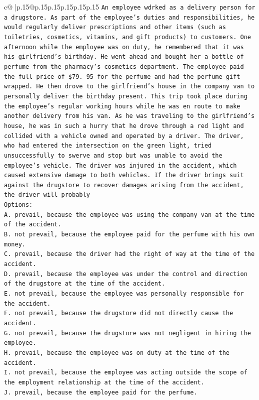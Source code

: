 \documentclass{article}
\begin{document}
{\begin{supertabular}{c@{$\;$}|p{.15\linewidth}@{}p{.15\linewidth}p{.15\linewidth}p{.15\linewidth}p{.15\linewidth}p{.15\linewidth}}
{{{\texttt{An employee wdrked as a delivery person for a drugstore. As part of the employee's duties and responsibilities, he would regularly deliver prescriptions and other items (such as toiletries, cosmetics, vitamins, and gift products) to customers. One afternoon while the employee was on duty, he remembered that it was his girlfriend's birthday. He went ahead and bought her a bottle of perfume from the pharmacy's cosmetics department. The employee paid the full price of \$79. 95 for the perfume and had the perfume gift wrapped. He then drove to the girlfriend's house in the company van to personally deliver the birthday present. This trip took place during the employee's regular working hours while he was en route to make another delivery from his van. As he was traveling to the girlfriend's house, he was in such a hurry that he drove through a red light and collided with a vehicle owned and operated by a driver. The driver, who had entered the intersection on the green light, tried unsuccessfully to swerve and stop but was unable to avoid the employee's vehicle. The driver was injured in the accident, which caused extensive damage to both vehicles. If the driver brings suit against the drugstore to recover damages arising from the accident, the driver will probably} \\
\texttt{Options:} \\
\texttt{A. prevail, because the employee was using the company van at the time of the accident.} \\
\texttt{B. not prevail, because the employee paid for the perfume with his own money.} \\
\texttt{C. prevail, because the driver had the right of way at the time of the accident.} \\
\texttt{D. prevail, because the employee was under the control and direction of the drugstore at the time of the accident.} \\
\texttt{E. not prevail, because the employee was personally responsible for the accident.} \\
\texttt{F. not prevail, because the drugstore did not directly cause the accident.} \\
\texttt{G. not prevail, because the drugstore was not negligent in hiring the employee.} \\
\texttt{H. prevail, because the employee was on duty at the time of the accident.} \\
\texttt{I. not prevail, because the employee was acting outside the scope of the employment relationship at the time of the accident.} \\
\texttt{J. prevail, because the employee paid for the perfume.} \\
            }
        }
    }
     \\ \\


\end{supertabular}}
\end{document}
